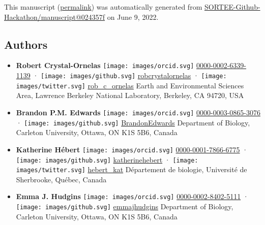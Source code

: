 This manuscript
(\href{https://SORTEE-Github-Hackathon.github.io/manuscript/v/024357f04df193fe87662943d6e0029321eca2a5/}{permalink})
was automatically generated
from \href{https://github.com/SORTEE-Github-Hackathon/manuscript/tree/024357f04df193fe87662943d6e0029321eca2a5}{SORTEE-Github-Hackathon/manuscript@024357f}
on June 9, 2022.

\hypertarget{authors}{%
\subsection{Authors}\label{authors}}

\begin{itemize}
\item
  \textbf{Robert Crystal-Ornelas}
  \texttt{[image: images/orcid.svg]}
  \href{https://orcid.org/0000-0002-6339-1139}{0000-0002-6339-1139}
  · \texttt{[image: images/github.svg]}
  \href{https://github.com/robcrystalornelas}{robcrystalornelas}
  · \texttt{[image: images/twitter.svg]}
  \href{https://twitter.com/rob_c_ornelas}{rob\_c\_ornelas}
  Earth and Environmental Sciences Area, Lawrence Berkeley National Laboratory, Berkeley, CA 94720, USA
\item
  \textbf{Brandon P.M. Edwards}
  \texttt{[image: images/orcid.svg]}
  \href{https://orcid.org/0000-0003-0865-3076}{0000-0003-0865-3076}
  · \texttt{[image: images/github.svg]}
  \href{https://github.com/BrandonEdwards}{BrandonEdwards}
  Department of Biology, Carleton University, Ottawa, ON K1S 5B6, Canada
\item
  \textbf{Katherine Hébert}
  \texttt{[image: images/orcid.svg]}
  \href{https://orcid.org/0000-0001-7866-6775}{0000-0001-7866-6775}
  · \texttt{[image: images/github.svg]}
  \href{https://github.com/katherinehebert}{katherinehebert}
  · \texttt{[image: images/twitter.svg]}
  \href{https://twitter.com/hebert_kat}{hebert\_kat}
  Département de biologie, Université de Sherbrooke, Québec, Canada
\item
  \textbf{Emma J. Hudgins}
  \texttt{[image: images/orcid.svg]}
  \href{https://orcid.org/0000-0002-8402-5111}{0000-0002-8402-5111}
  · \texttt{[image: images/github.svg]}
  \href{https://github.com/emmajhudgins}{emmajhudgins}
  Department of Biology, Carleton University, Ottawa, ON K1S 5B6, Canada

\end{itemize}
